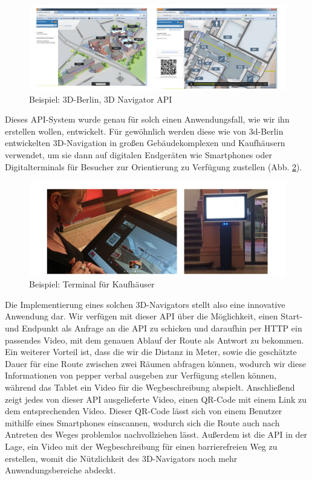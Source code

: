 \begin{figure}[H]
    \includegraphics[width=\textwidth]{Figures/3DNavigator/3d-berlin_bsp.jpg}
    \caption{Beispiel: 3D-Berlin, 3D Navigator API}
    \label{fig:3dberlin-images}
    \centering
\end{figure}

Dieses API-System wurde genau für solch einen Anwendungsfall, wie wir ihn erstellen wollen, entwickelt. Für gewöhnlich werden diese wie von 3d-Berlin entwickelten 3D-Navigation in großen Gebäudekomplexen und Kaufhäusern verwendet, um sie dann auf digitalen Endgeräten wie Smartphones oder Digitalterminals für Besucher zur Orientierung zu Verfügung zustellen (Abb. \ref{fig:kaufhausbilder}).\\

\begin{figure}[H]
    \includegraphics[width=\textwidth]{Figures/3DNavigator/terminal_bsp.jpg}
    \caption{Beispiel: Terminal für Kaufhäuser}
    \label{fig:kaufhausbilder}
    \centering
\end{figure}

Die Implementierung eines solchen 3D-Navigators stellt also eine innovative Anwendung dar. Wir verfügen mit dieser API über die Möglichkeit, einen Start- und Endpunkt als Anfrage an die API zu schicken und daraufhin per HTTP ein passendes Video, mit dem genauen Ablauf der Route als Antwort zu bekommen. Ein weiterer Vorteil ist, dass die wir die Distanz in Meter, sowie die geschätzte Dauer für eine Route zwischen zwei Räumen abfragen können, wodurch wir diese Informationen von pepper verbal ausgeben zur Verfügung stellen können, während das Tablet ein Video für die Wegbeschreibung abspielt. Anschließend zeigt jedes von dieser API ausgelieferte Video, einen QR-Code mit einem Link zu dem entsprechenden Video. Dieser QR-Code lässt sich von einem Benutzer mithilfe eines Smartphones einscannen, wodurch sich die Route auch nach Antreten des Weges problemlos nachvollziehen lässt. Außerdem ist die API in der Lage, ein Video mit der Wegbeschreibung für einen barrierefreien Weg zu erstellen, womit die Nützlichkeit des 3D-Navigators noch mehr Anwendungsbereiche abdeckt.\\

